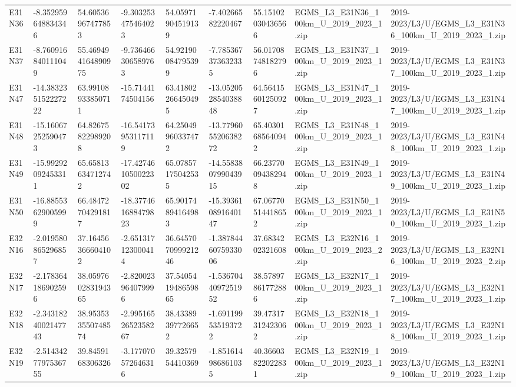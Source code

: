 \begin{landscape}
\begin{longtable}{lllllllll}
E31N36 & -8.352959648834346 & 54.60536967477853 & -9.303253475464023 & 54.05971904519139 & -7.40266582220467 & 55.15102030436566 & EGMS\_L3\_E31N36\_100km\_U\_2019\_2023\_1.zip & 2019-2023/L3/U/EGMS\_L3\_E31N36\_100km\_U\_2019\_2023\_1.zip \\
E31N37 & -8.760916840111049 & 55.469494164890975 & -9.736466306589763 & 54.92190084795399 & -7.785367373632335 & 56.01708748182796 & EGMS\_L3\_E31N37\_100km\_U\_2019\_2023\_1.zip & 2019-2023/L3/U/EGMS\_L3\_E31N37\_100km\_U\_2019\_2023\_1.zip \\
E31N47 & -14.383235152227222 & 63.99108933850711 & -15.7144174504156 & 63.41802266450495 & -13.052052854038848 & 64.56415601250927 & EGMS\_L3\_E31N47\_100km\_U\_2019\_2023\_1.zip & 2019-2023/L3/U/EGMS\_L3\_E31N47\_100km\_U\_2019\_2023\_1.zip \\
E31N48 & -15.16067252590473 & 64.82675822989208 & -16.54173953117119 & 64.25049960337472 & -13.779605520638272 & 65.40301685640942 & EGMS\_L3\_E31N48\_100km\_U\_2019\_2023\_1.zip & 2019-2023/L3/U/EGMS\_L3\_E31N48\_100km\_U\_2019\_2023\_1.zip \\
E31N49 & -15.99292092453311 & 65.65813634712742 & -17.427461050022302 & 65.07857175042535 & -14.558380799043915 & 66.23770094382948 & EGMS\_L3\_E31N49\_100km\_U\_2019\_2023\_1.zip & 2019-2023/L3/U/EGMS\_L3\_E31N49\_100km\_U\_2019\_2023\_1.zip \\
E31N50 & -16.88553629005999 & 66.48472704291817 & -18.377461688479823 & 65.90174894164983 & -15.393610891640147 & 67.06770514418652 & EGMS\_L3\_E31N50\_100km\_U\_2019\_2023\_1.zip & 2019-2023/L3/U/EGMS\_L3\_E31N50\_100km\_U\_2019\_2023\_1.zip \\
E32N16 & -2.019580865296857 & 37.16456366604102 & -2.651317123000414 & 36.645707099921246 & -1.3878446075933006 & 37.6834202321608 & EGMS\_L3\_E32N16\_100km\_U\_2019\_2023\_2.zip & 2019-2023/L3/U/EGMS\_L3\_E32N16\_100km\_U\_2019\_2023\_2.zip \\
E32N17 & -2.178364186902596 & 38.059760283194365 & -2.820023964079996 & 37.540541948659865 & -1.5367044097251952 & 38.57897861772886 & EGMS\_L3\_E32N17\_100km\_U\_2019\_2023\_1.zip & 2019-2023/L3/U/EGMS\_L3\_E32N17\_100km\_U\_2019\_2023\_1.zip \\
E32N18 & -2.3431824002147743 & 38.953533550748574 & -2.9951652652358267 & 38.43389397726652 & -1.691199535193722 & 39.47317312423062 & EGMS\_L3\_E32N18\_100km\_U\_2019\_2023\_1.zip & 2019-2023/L3/U/EGMS\_L3\_E32N18\_100km\_U\_2019\_2023\_1.zip \\
E32N19 & -2.5143427797536755 & 39.8459168306326 & -3.177070572646316 & 39.3257954410369 & -1.851614986861035 & 40.36603822022831 & EGMS\_L3\_E32N19\_100km\_U\_2019\_2023\_1.zip & 2019-2023/L3/U/EGMS\_L3\_E32N19\_100km\_U\_2019\_2023\_1.zip \\

\end{longtable}
\end{landscape}
